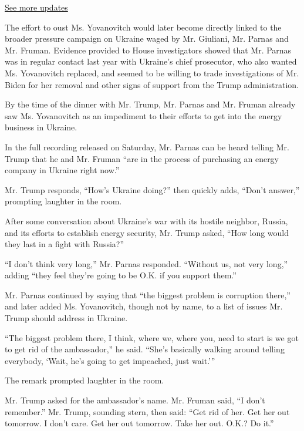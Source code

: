\href{https://www.nytimes.com/2020/07/31/us/elections/biden-vs-trump.html?action=click\&pgtype=Article\&state=default\&region=MAIN_CONTENT_1\&context=storylines_live_updates}{See
more updates}

The effort to oust Ms. Yovanovitch would later become directly linked to
the broader pressure campaign on Ukraine waged by Mr. Giuliani, Mr.
Parnas and Mr. Fruman. Evidence provided to House investigators showed
that Mr. Parnas was in regular contact last year with Ukraine's chief
prosecutor, who also wanted Ms. Yovanovitch replaced, and seemed to be
willing to trade investigations of Mr. Biden for her removal and other
signs of support from the Trump administration.

By the time of the dinner with Mr. Trump, Mr. Parnas and Mr. Fruman
already saw Ms. Yovanovitch as an impediment to their efforts to get
into the energy business in Ukraine.

In the full recording released on Saturday, Mr. Parnas can be heard
telling Mr. Trump that he and Mr. Fruman ``are in the process of
purchasing an energy company in Ukraine right now.''

Mr. Trump responds, ``How's Ukraine doing?'' then quickly adds, ``Don't
answer,'' prompting laughter in the room.

After some conversation about Ukraine's war with its hostile neighbor,
Russia, and its efforts to establish energy security, Mr. Trump asked,
``How long would they last in a fight with Russia?''

``I don't think very long,'' Mr. Parnas responded. ``Without us, not
very long,'' adding ``they feel they're going to be O.K. if you support
them.''

Mr. Parnas continued by saying that ``the biggest problem is corruption
there,'' and later added Ms. Yovanovitch, though not by name, to a list
of issues Mr. Trump should address in Ukraine.

``The biggest problem there, I think, where we, where you, need to start
is we got to get rid of the ambassador,'' he said. ``She's basically
walking around telling everybody, `Wait, he's going to get impeached,
just wait.'''

The remark prompted laughter in the room.

Mr. Trump asked for the ambassador's name. Mr. Fruman said, ``I don't
remember.'' Mr. Trump, sounding stern, then said: ``Get rid of her. Get
her out tomorrow. I don't care. Get her out tomorrow. Take her out.
O.K.? Do it.''


